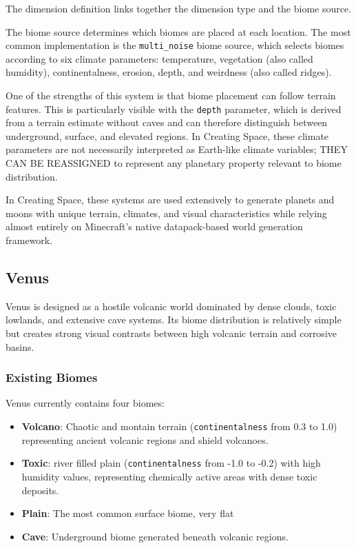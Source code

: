 \documentclass{article}
\begin{document}
The dimension definition links together the dimension type and the biome source.

The biome source determines which biomes are placed at each location. The most common implementation is the \texttt{multi\_noise} biome source, which selects biomes according to six climate parameters: temperature, vegetation (also called humidity), continentalness, erosion, depth, and weirdness (also called ridges).

One of the strengths of this system is that biome placement can follow terrain features. This is particularly visible with the \texttt{depth} parameter, which is derived from a terrain estimate without caves and can therefore distinguish between underground, surface, and elevated regions. In Creating Space, these climate parameters are not necessarily interpreted as Earth-like climate variables; THEY CAN BE REASSIGNED to represent any planetary property relevant to biome distribution.

In Creating Space, these systems are used extensively to generate planets and moons with unique terrain, climates, and visual characteristics while relying almost entirely on Minecraft's native datapack-based world generation framework.


\subsection{Venus}

Venus is designed as a hostile volcanic world dominated by dense clouds, toxic lowlands, and extensive cave systems. Its biome distribution is relatively simple but creates strong visual contrasts between high volcanic terrain and corrosive basins.

\subsubsection{Existing Biomes}

Venus currently contains four biomes:

\begin{itemize}
    \item \textbf{Volcano}: Chaotic and montain terrain (\texttt{continentalness} from 0.3 to 1.0) representing ancient volcanic regions and shield volcanoes.
    \item \textbf{Toxic}: river filled plain (\texttt{continentalness} from -1.0 to -0.2) with high humidity values, representing chemically active areas with dense toxic deposits.
    \item \textbf{Plain}: The most common surface biome, very flat
    \item \textbf{Cave}: Underground biome generated beneath volcanic regions.
\end{itemize}
\end{document}
